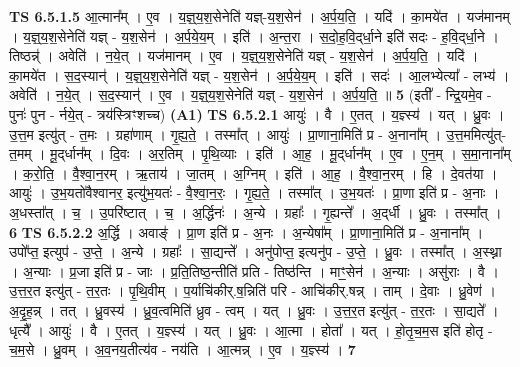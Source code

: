 \documentclass[17pt]{extarticle}
\begin{document}
                  \newline
                                \textbf{ TS 6.5.1.5} \newline
                  आ॒त्मान᳚म् । ए॒व । य॒ज्ञ्॒य॒श॒सेनेति॑ यज्ञ्-य॒श॒सेन॑ । अ॒र्प॒य॒ति॒ । यदि॑ । का॒मये॑त । यज॑मानम् । य॒ज्ञ्॒य॒श॒सेनेति॑ यज्ञ् - य॒श॒सेन॑ । अ॒र्प॒ये॒य॒म् । इति॑ । अ॒न्त॒रा । स॒दो॒ह॒वि॒द्‌र्धा॒ने इति॑ सदः - ह॒वि॒द्‌र्धा॒ने । तिष्ठन्न्॑ । अवेति॑ । न॒ये॒त् । यज॑मानम् । ए॒व । य॒ज्ञ्॒य॒श॒सेनेति॑ यज्ञ् - य॒श॒सेन॑ । अ॒र्प॒य॒ति॒ । यदि॑ । का॒मये॑त । स॒द॒स्यान्॑ । य॒ज्ञ्॒य॒श॒सेनेति॑ यज्ञ् - य॒श॒सेन॑ । अ॒र्प॒ये॒य॒म् । इति॑ । सदः॑ । आ॒लभ्येत्या᳚ - लभ्य॑ । अवेति॑ । न॒ये॒त् । स॒द॒स्यान्॑ । ए॒व । य॒ज्ञ्॒य॒श॒सेनेति॑ यज्ञ् - य॒श॒सेन॑ । अ॒र्प॒य॒ति॒ ॥ \textbf{  5} \newline
                  \newline
                      (इती᳚ - न्द्रि॒यमे॒व - पुनः॑ पुन - र्नये॒त् - त्रय॑स्त्रिꣳशच्च)  \textbf{(A1)} \newline \newline
                                \textbf{ TS 6.5.2.1} \newline
                  आयुः॑ । वै । ए॒तत् । य॒ज्ञ्स्य॑ । यत् । ध्रु॒वः । उ॒त्त॒म इत्यु॑त् - त॒मः । ग्रहा॑णाम् । गृ॒ह्य॒ते॒ । तस्मा᳚त् । आयुः॑ । प्रा॒णाना॒मिति॑ प्र - अ॒नाना᳚म् । उ॒त्त॒ममित्यु॑त्-त॒मम् । मू॒द्‌र्धान᳚म् । दि॒वः । अ॒र॒तिम् । पृ॒थि॒व्याः । इति॑ । आ॒ह॒ । मू॒द्‌र्धान᳚म् । ए॒व । ए॒न॒म् । स॒मा॒नाना᳚म् । क॒रो॒ति॒ । वै॒श्वा॒न॒रम् । ऋ॒ताय॑ । जा॒तम् । अ॒ग्निम् । इति॑ । आ॒ह॒ । वै॒श्वा॒न॒रम् । हि । दे॒वत॑या । आयुः॑ । उ॒भ॒यतो॑वैश्वानर॒ इत्यु॑भ॒यतः॑ - वै॒श्वा॒न॒रः॒ । गृ॒ह्य॒ते॒ । तस्मा᳚त् । उ॒भ॒यतः॑ । प्रा॒णा इति॑ प्र - अ॒नाः । अ॒धस्ता᳚त् । च॒ । उ॒परि॑ष्टात् । च॒ । अ॒र्द्धिनः॑ । अ॒न्ये । ग्रहाः᳚ । गृ॒ह्यन्ते᳚ । अ॒द्‌र्धी । ध्रु॒वः । तस्मा᳚त् । \textbf{  6} \newline
                  \newline
                                \textbf{ TS 6.5.2.2} \newline
                  अ॒र्द्धि । अवाङ्॑ । प्रा॒ण इति॑ प्र - अ॒नः । अ॒न्येषा᳚म् । प्रा॒णाना॒मिति॑ प्र - अ॒नाना᳚म् । उपो᳚प्त॒ इत्युप॑ - उ॒प्ते॒ । अ॒न्ये । ग्रहाः᳚ । सा॒द्यन्ते᳚ । अनु॑पोप्त॒ इत्यनु॑प - उ॒प्ते॒ । ध्रु॒वः । तस्मा᳚त् । अ॒स्थ्ना । अ॒न्याः । प्र॒जा इति॑ प्र - जाः । प्र॒ति॒तिष्ठ॒न्तीति॑ प्रति - तिष्ठ॑न्ति । माꣳ॒॒सेन॑ । अ॒न्याः । असु॑राः । वै । उ॒त्त॒र॒त इत्यु॑त् - त॒र॒तः । पृ॒थि॒वीम् । प॒र्याचि॑कीर्.ष॒न्निति॑ परि - आचि॑कीर्.षन्न् । ताम् । दे॒वाः । ध्रु॒वेण॑ । अ॒दृ॒ह॒न्न् । तत् । ध्रु॒वस्य॑ । ध्रु॒व॒त्वमिति॑ ध्रुव - त्वम् । यत् । ध्रु॒वः । उ॒त्त॒र॒त इत्यु॑त् - त॒र॒तः । सा॒द्यते᳚ । धृत्यै᳚ । आयुः॑ । वै । ए॒तत् । य॒ज्ञ्स्य॑ । यत् । ध्रु॒वः । आ॒त्मा । होता᳚ । यत् । हो॒तृ॒च॒म॒स इति॑ होतृ - च॒म॒से । ध्रु॒वम् । अ॒व॒नय॒तीत्य॑व - नय॑ति । आ॒त्मन्न् । ए॒व । य॒ज्ञ्स्य॑ । \textbf{  7} \newline
\end{document}
